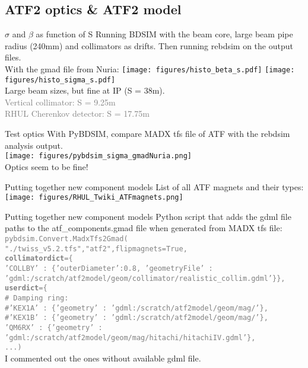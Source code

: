 \documentclass[xcolor={dvipsnames}]{beamer}
\begin{document}
\subsection{ATF2 optics \& ATF2 model}
\begin{frame}{$\sigma$ and $\beta$ as function of S}
Running BDSIM with the beam core, large beam pipe radius (240mm) and collimators as drifts. 
Then running rebdsim on the output files.\\
With the gmad file from Nuria:
 \texttt{[image: figures/histo\_beta\_s.pdf]}
 \texttt{[image: figures/histo\_sigma\_s.pdf]}\\
Large beam sizes, but fine at IP (S = 38m).\\
\textcolor{Gray}{Vertical collimator: S = 9.25m\\
RHUL Cherenkov detector: S = 17.75m}
\end{frame}

\begin{frame}{Test optics}
With PyBDSIM, compare MADX tfs file of ATF with the rebdsim analysis output.\\
 \texttt{[image: figures/pybdsim\_sigma\_gmadNuria.png]}\\
Optics seem to be fine!
\end{frame}

\begin{frame}{Putting together new component models}
List of all ATF magnets and their types:\\
\vspace*{0.5cm}
\texttt{[image: figures/RHUL\_Twiki\_ATFmagnets.png]}
\end{frame}

\begin{frame}{Putting together new component models}
Python script that adds the gdml file paths to the atf\_components.gmad file when generated from MADX tfs file:\\
\vspace*{0.2cm}
\textcolor{Gray}{\texttt{\small pybdsim.Convert.MadxTfs2Gmad(\\
"./twiss\_v5.2.tfs","atf2",flipmagnets=True,\\
\textbf{collimatordict}=\{\\
'COLLBY' : \{'outerDiameter':0.8, 'geometryFile' : 'gdml:/scratch/atf2model/geom/collimator/realistic\_collim.gdml'\}\},\\
\textbf{userdict}=\{\\
\# Damping ring:\\
\#'KEX1A' : \{'geometry' : 'gdml:/scratch/atf2model/geom/mag/'\},\\
\#'KEX1B' : \{'geometry' : 'gdml:/scratch/atf2model/geom/mag/'\},\\
'QM6RX' : \{'geometry' : 'gdml:/scratch/atf2model/geom/mag/hitachi/hitachiIV.gdml'\},\\
...)
}}\\
\vspace*{0.2cm}
I commented out the ones without available gdml file.
\end{frame}
\end{document}
